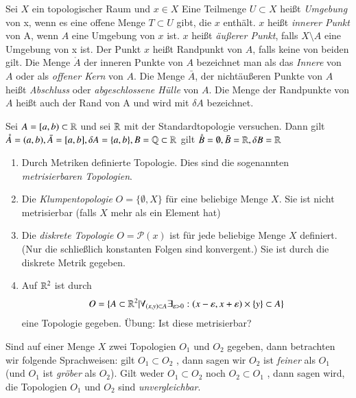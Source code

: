 \documentclass[a4paper,10pt]{scrartcl}
\newcommand{\eps}{\varepsilon}
\begin{document}
\begin{df}
Sei $ X $ ein topologischer Raum und  $x \in X $ Eine Teilmenge $ U \subset X $ heißt \emph{Umgebung} von x, wenn es eine offene Menge $ T\subset U $ gibt, die $ x $ enthält.  $ x $ heißt \emph{innerer Punkt} von A, wenn $ A $ eine Umgebung von $ x $ ist. $ x $ heißt \emph{äußerer Punkt}, falls $ X\setminus A $ eine Umgebung von x ist. Der Punkt $ x $ heißt Randpunkt von $ A $, falls keine von beiden gilt.  Die Menge $ \mathring{A} $ der inneren Punkte von $ A $ bezeichnet man als das \emph{Innere} von $ A $ oder als \emph{offener Kern} von $ A $. Die Menge $ \bar A $, der nichtäußeren Punkte von $ A $ heißt \emph{Abschluss} oder \emph{abgeschlossene Hülle} von $ A $.  Die Menge der Randpunkte von $  A $  heißt auch der Rand von A und wird mit $ \delta A $ bezeichnet. 
\end{df}

\begin{ex*}
Sei $ A=[a,b)\subset \mathbb{R} $ und sei $\mathbb{R}$ mit der Standardtopologie versuchen.  Dann gilt $\mathring A=(a,b), \bar A=[a,b], \delta A=\{a,b\}, B=\mathbb{Q}\subset \mathbb{R}$ gilt $ \mathring B=\emptyset, \bar B=\mathbb{R}, \delta B=\mathbb{R} $ 
\end{ex*}
\begin{ex}\label{thm:1.12}
\begin{enumerate}
\item Durch Metriken definierte Topologie. Dies sind die sogenannten \emph{metrisierbaren Topologien}.
\item Die \emph{Klumpentopologie} $ O=\{\emptyset, X\} $ für eine beliebige Menge $ X $.  Sie ist nicht metrisierbar (falls $ X $ mehr als ein Element hat)
\item Die \emph{diskrete Topologie} $ O=\mathcal{P}(x) $ ist für jede beliebige Menge $ X $ definiert.  (Nur die schließlich konstanten Folgen sind konvergent.) Sie ist durch die diskrete Metrik gegeben.
\item Auf $\mathbb{R}^2$ ist durch
\[
O=\{A\subset \R^2|\forall_{(x,y)\subset A}\exists_{\eps>0}:(x-\eps,x+\eps) \times \{y\} \subset A\}
\]
eine Topologie gegeben. Übung: Ist diese metrisierbar?
\end{enumerate}

\end{ex}

\begin{df}
Sind auf einer Menge $X$ zwei Topologien $ O_1$ und $ O_2 $ gegeben, dann betrachten wir folgende Sprachweisen: gilt $ O_1 \subset O_2 $ , dann sagen wir $ O_2 $ ist \emph{feiner} als $ O_1 $ (und $ O_1 $ ist \emph{gröber} als $ O_2 $).  Gilt weder $ O_1 \subset O_2 $ noch $ O_2\subset O_1 $ , dann sagen wird, die Topologien $ O_1 $ und $ O_2 $ sind \emph{unvergleichbar}.
\end{df}
\end{document}
